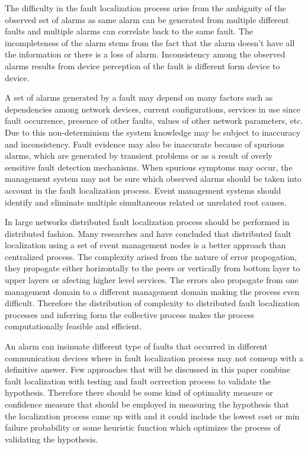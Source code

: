 \documentclass[10pt]{sigplan-proc-varsize}
\begin{document}
The difficulty in the fault localization process arise from the ambiguity of the observed set of alarms as same alarm can be generated from multiple different faults 
and multiple alarms can correlate back to the same fault. The incompleteness of the alarm stems from the fact that the alarm doesn't have all the information or 
there is a loss of alarm. Inconsistency among the observed alarms results from device perception of the fault is different form device to device.  

A set of alarms generated by a fault may depend on many factors such as dependencies among network devices, current configurations, services in use since 
fault occurrence, presence of other faults, values of other network parameters, etc. Due to this non-determinism the system knowledge may be subject to inaccuracy 
and inconsistency. Fault evidence may also be inaccurate because of spurious alarms, which are generated by transient problems or as a result of overly sensitive 
fault detection mechanisms. When spurious symptoms may occur, the management system may not be sure which observed alarms should be taken into account in the fault 
localization process. Event management systems should identify and eliminate multiple simultaneous related or unrelated root causes. 

In large networks distributed fault localization process should be performed in distributed fashion. Many researches \cite{Katzela:1995} and \cite{Yemini:1996} have 
concluded that distributed fault localization using a set of event management nodes is a better approach than centralized process. The complexity arised from the nature 
of error propogation, they propogate either horizontally to the peers or vertically from bottom layer to upper layers or afecting higher level services. The errors also
propogate from one management domain to a different management domain making the process even difficult. Therefore the distribution of complexity to distributed fault 
localization processes and inferring form the collective process makes the process computationally feasible and efficient. 

An alarm can insinuate different type of faults that occurred in different communication devices where in fault localization process may not comeup with a 
definitive answer. Few approaches that will be discussed in this paper combine fault localization with testing and fault ocrrection process to validate the hypothesis. 
Therefore there should be some kind of optimality measure or confidence measure that should be employed in measuring the hypothesis that the localization process 
came up with and it could include the lowest cost or min failure probability or some heuristic function which optimizes the process of validating the hypothesis.
\end{document}
